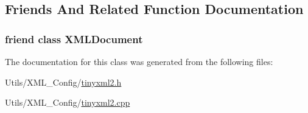 \subsection{Friends And Related Function Documentation}
\hypertarget{classtinyxml2_1_1_x_m_l_declaration_a4eee3bda60c60a30e4e8cd4ea91c4c6e}{
\subsubsection[{X\-M\-L\-Document}]{\setlength{\rightskip}{0pt plus 5cm}friend class {\bf X\-M\-L\-Document}\hspace{0.3cm}{\ttfamily [friend]}}}\label{classtinyxml2_1_1_x_m_l_declaration_a4eee3bda60c60a30e4e8cd4ea91c4c6e}


The documentation for this class was generated from the following files\-:\begin{DoxyCompactItemize}
\item 
Utils/\-X\-M\-L\-\_\-\-Config/\hyperlink{tinyxml2_8h}{tinyxml2.\-h}\item 
Utils/\-X\-M\-L\-\_\-\-Config/\hyperlink{tinyxml2_8cpp}{tinyxml2.\-cpp}\end{DoxyCompactItemize}
